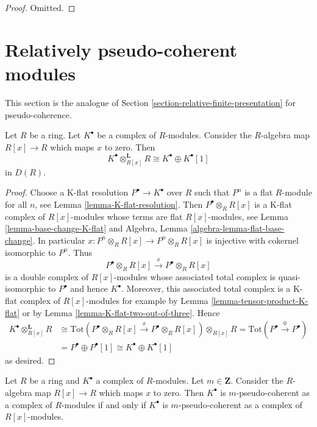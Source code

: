 \begin{proof}
Omitted.
\end{proof}






\section{Relatively pseudo-coherent modules}
\label{section-relative-pseudo-coherent}

\noindent
This section is the analogue of
Section \ref{section-relative-finite-presentation}
for pseudo-coherence.

\begin{lemma}
\label{lemma-pull-push}
Let $R$ be a ring. Let $K^\bullet$ be a complex of $R$-modules.
Consider the $R$-algebra map $R[x] \to R$ which maps $x$ to zero.
Then
$$
K^\bullet \otimes_{R[x]}^{\mathbf{L}} R \cong K^\bullet \oplus K^\bullet[1]
$$
in $D(R)$.
\end{lemma}

\begin{proof}
Choose a K-flat resolution $P^\bullet \to K^\bullet$ over $R$
such that $P^n$ is a flat $R$-module for all $n$, see
Lemma \ref{lemma-K-flat-resolution}. Then $P^\bullet \otimes_R R[x]$
is a K-flat complex of $R[x]$-modules whose terms are flat $R[x]$-modules, see
Lemma \ref{lemma-base-change-K-flat} and
Algebra, Lemma \ref{algebra-lemma-flat-base-change}.
In particular $x : P^n \otimes_R R[x] \to P^n \otimes_R R[x]$
is injective with cokernel isomorphic to $P^n$. Thus
$$
P^\bullet \otimes_R R[x] \xrightarrow{x} P^\bullet \otimes_R R[x]
$$
is a double complex of $R[x]$-modules whose associated
total complex is quasi-isomorphic to $P^\bullet$ and hence $K^\bullet$.
Moreover, this associated total complex is a K-flat complex
of $R[x]$-modules for example by
Lemma \ref{lemma-tensor-product-K-flat} or by
Lemma \ref{lemma-K-flat-two-out-of-three}.
Hence
\begin{align*}
K^\bullet \otimes_{R[x]}^{\mathbf{L}} R
& \cong
\text{Tot}(P^\bullet \otimes_R R[x] \xrightarrow{x} P^\bullet \otimes_R R[x])
\otimes_{R[x]} R =
\text{Tot}(P^\bullet \xrightarrow{0} P^\bullet) \\
& = P^\bullet \oplus P^\bullet[1] \cong K^\bullet \oplus K^\bullet[1]
\end{align*}
as desired.
\end{proof}

\begin{lemma}
\label{lemma-add-variable-pseudo-coherent}
Let $R$ be a ring and $K^\bullet$ a complex of $R$-modules.
Let $m \in \mathbf{Z}$. Consider the $R$-algebra map $R[x] \to R$
which maps $x$ to zero. Then $K^\bullet$ is $m$-pseudo-coherent as
a complex of $R$-modules if and only if $K^\bullet$ is $m$-pseudo-coherent
as a complex of $R[x]$-modules.
\end{lemma}

